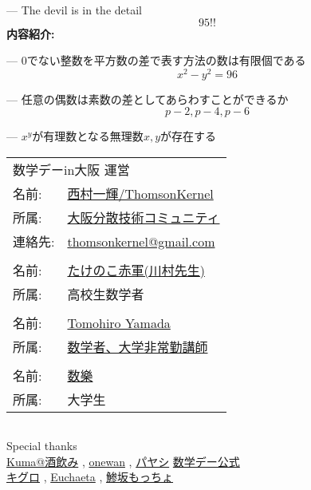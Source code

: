 \documentclass[b5paper,fleqn]{ltjsarticle}
\newcounter{numcount}
\newcommand\tit[1]{\newpage\noindent{\bf\large 第\thenumcount 回} ---
#1\hfill\datedate\vskip1pt}
\newcommand\contents{{\bf 内容紹介:\vskip5pt}\stepcounter{numcount}}
\begin{document}
\tit{The devil is in the detail}
\[95!!\]
\contents

\tit{0でない整数を平方数の差で表す方法の数は有限個である}
\[x^2-y^2=96\]

\tit{任意の偶数は素数の差としてあらわすことができるか}
\[p-2,p-4,p-6\]

\tit{$x^y$が有理数となる無理数$x,y$が存在する}


\newpage
\thispagestyle{empty}
\vspace*{\fill}
\begin{flushright}
\begin{minipage}{0.5\hsize}
  \begin{tabular}{|ll}
  \multicolumn{2}{|l}{数学デーin大阪 運営}\\[10pt]
  名前: &\href{https://twitter.com/ThomsonKernel}{西村一輝/ThomsonKernel}\\
  所属: &\href{https://sites.google.com/view/osaka-dtc}{大阪分散技術コミュニティ}\\
  連絡先: & \href{mailto:thomsonkernel@gmail.com}{thomsonkernel@gmail.com}\\
  \\
  名前: &\href{https://twitter.com/691_7758337633}{たけのこ赤軍(川村先生)}\\
  所属: &高校生数学者\\
  \\
  名前: &\href{https://twitter.com/tyamada1093}{Tomohiro Yamada}\\
  所属: &\href{https://kansai-lisp-useres.connpass.com}{数学者、大学非常勤講師}\\
  \\
  名前: &\href{https://twitter.com/coc_mathfun}{数樂}\\
  所属: &大学生
  \end{tabular}
  \begin{tabular}{l}
\end{tabular}\vskip15pt
Special thanks\\
   \href{https://twitter.com/notori48}{Kuma@酒飲み}
   , \href{https://twitter.com/ONEWAN}{onewan}
   , \href{https://twitter.com/Paya_payashi}{パヤシ}\vskip10pt
   \href{https://twitter.com/sugaku_day}{数学デー公式}\\
   \href{https://twitter.com/kiguro_masanao}{キグロ}
   , \href{https://twitter.com/euchaeta}{Euchaeta}
   , \href{https://twitter.com/motcho_tw}{鯵坂もっちょ}
\end{minipage}
\end{flushright}
\end{document}
